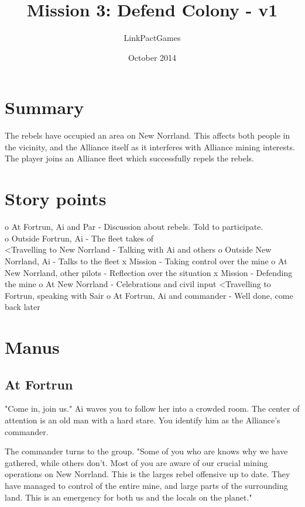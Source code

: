 \documentclass[a4paper,12pt]{article}
\begin{document}
\title{Mission 3: Defend Colony - v1}
\author{LinkPactGames}
\date{October 2014}
\maketitle

\section{Summary}

The rebels have occupied an area on New Norrland. This affects both people in
the vicinity, and the Alliance itself as it interferes with Alliance
mining interests. The player joins an Alliance fleet which successfully
repels the rebels.

\section{Story points}

o At Fortrun, Ai and Par - Discussion about rebels. Told to participate.\\
o Outside Fortrun, Ai - The fleet takes of\\
\textless Travelling to New Norrland - Talking with Ai and others
o Outside New Norrland, Ai - Talks to the fleet
x Mission - Taking control over the mine
o At New Norrland, other pilots - Reflection over the situation
x Mission - Defending the mine
o At New Norrland - Celebrations and civil input
\textless Travelling to Fortrun, speaking with Sair
o At Fortrun, Ai and commander - Well done, come back later

\section{Manus}

\subsection{At Fortrun}

"Come in, join us." Ai waves you to follow her into a crowded room.
The center of attention is an old man with a hard stare. You identify him
as the Alliance's commander.

The commander turns to the group. "Some of you who are knows why we have gathered,
while others don't. Most of you are aware of our crucial mining operations on New
Norrland. This is the larges rebel offensive up to date. They have managed to control
of the entire mine, and large parts of the surrounding land. This is an emergency for
both us and the locals on the planet."
\end{document}
